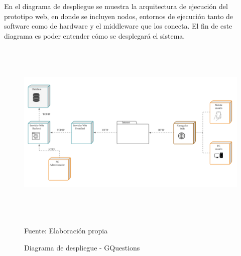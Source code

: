 \documentclass[../Main.tex]{subfiles}
\begin{document}
    \begin{justify}
    En el diagrama de despliegue se muestra la arquitectura de ejecución del prototipo web, en donde se incluyen nodos, entornos de ejecución tanto de software como de hardware y el middleware que los conecta. El fin de este diagrama es poder entender cómo se desplegará el sistema.
    \end{justify}
    
    \begin{figure}[H]
	\begin{Center}
		\includegraphics[width=6.4in,height=3.5in]{Images/diagrama_despliegue_GQuestions.png}
	    \caption{Diagrama de despliegue - GQuestions}
	    Fuente: Elaboración propia
        \label{fig:section}
	\end{Center}
    \end{figure}
\end{document}
